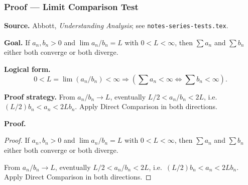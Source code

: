 
\clearpage
{}
\hypertarget{proof-RA-ABB-T-limit-comparison}{}

\subsubsection[Limit Comparison Test]{Proof --- Limit Comparison Test}

\bigskip

\noindent
\textbf{Source.}
Abbott, \emph{Understanding Analysis}; see \texttt{notes-series-tests.tex}.

\vspace{0.75em}

\noindent
\textbf{Goal.}
If $a_n, b_n > 0$ and $\lim a_n/b_n = L$ with $0 < L < \infty$, then $\sum a_n$ and $\sum b_n$ either both converge or both diverge.

\vspace{0.75em}

\noindent
\textbf{Logical form.}
\[
  0 < L = \lim (a_n/b_n) < \infty \Rightarrow (\sum a_n < \infty \Longleftrightarrow \sum b_n < \infty).
\]

\vspace{0.75em}

\noindent
\textbf{Proof strategy.}
From $a_n/b_n \to L$, eventually $L/2 < a_n/b_n < 2L$, i.e.\ $(L/2)b_n < a_n < 2L b_n$. Apply Direct Comparison in both directions.

\vspace{0.75em}

\noindent
\textbf{Proof.}
\begin{proof}
\Claim If $a_n, b_n > 0$ and $\lim a_n/b_n = L$ with $0 < L < \infty$, then $\sum a_n$ and $\sum b_n$ either both converge or both diverge.

\Given 

\Goal 

\Strategy From $a_n/b_n \to L$, eventually $L/2 < a_n/b_n < 2L$, i.e.\ $(L/2)b_n < a_n < 2L b_n$. Apply Direct Comparison in both directions.

\medskip


\end{proof}

